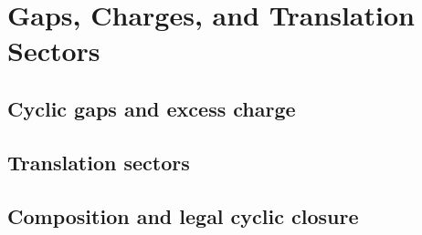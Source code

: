 \section{Gaps, Charges, and Translation Sectors}
\label{sec:gaps-charges-sectors}

\subsection{Cyclic gaps and excess charge}
\label{subsec:cyclic-gaps-excess-charge}

\TaskDraftStub

\subsection{Translation sectors}
\label{subsec:translation-sectors}

\TaskDraftStub

\subsection{Composition and legal cyclic closure}
\label{subsec:composition-legal-cyclic-closure}

\TaskDraftStub
